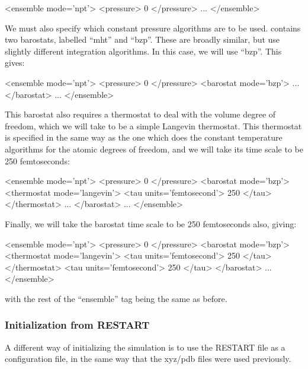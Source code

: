 \documentclass[11pt,english,fleqn]{report}
\newenvironment{code}{%
\footnotesize 
\verbatim
}{
\endverbatim
\normalsize
}
\begin{document}
\begin{code}
<ensemble mode='npt'>
   <pressure> 0 </pressure>
   ...
</ensemble>
\end{code}

We must also specify which constant pressure algorithms are to be used.
\ipi contains two barostats, labelled {}``mht'' and {}``bzp''. These are
broadly similar, but use slightly different integration algorithms.
In this case, we will use {}``bzp''. This gives:


\begin{code}
<ensemble mode='npt'>
   <pressure> 0 </pressure>
   <barostat mode='bzp'>
      ...
   </barostat>
   ...
</ensemble>
\end{code}

This barostat also requires a 
thermostat to deal with the volume degree of freedom, which we will take
to be a simple Langevin thermostat.
This thermostat is specified in the same way as the one which does the
constant temperature algorithms for the atomic degrees of freedom, and
we will take its time scale to be 250 femtoseconds:

\begin{code}
<ensemble mode='npt'>
   <pressure> 0 </pressure>
   <barostat mode='bzp'>
      <thermostat mode='langevin'>
         <tau units='femtosecond'> 250 </tau>
      </thermostat>
      ...
   </barostat>
   ...
</ensemble>
\end{code}

Finally, we will take the barostat time scale to be 250 femtoseconds also, giving:

\begin{code}
<ensemble mode='npt'>
   <pressure> 0 </pressure>
   <barostat mode='bzp'>
      <thermostat mode='langevin'>
         <tau units='femtosecond'> 250 </tau>
      </thermostat>
      <tau units='femtosecond'> 250 </tau>
   </barostat>
   ...
</ensemble>
\end{code}
with the rest of the {}``ensemble'' tag being the same as before.

\subsubsection{Initialization from RESTART}

A different way of initializing the simulation is to use the 
RESTART file as a configuration file, in the same way that
the xyz/pdb files were used previously.
\end{document}
